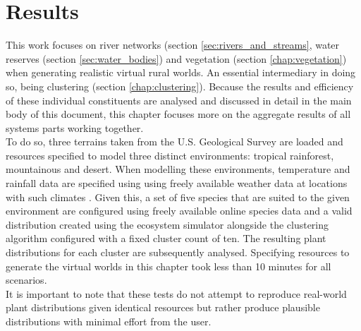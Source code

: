 \chapter{Results}

This work focuses on river networks (section \ref{sec:rivers_and_streams}, water reserves (section \ref{sec:water_bodies}) and vegetation (section \ref{chap:vegetation}) when generating realistic virtual rural worlds. An essential intermediary in doing so, being clustering (section \ref{chap:clustering}). Because the results and efficiency of these individual constituents are analysed and discussed in detail in the main body of this document, this chapter focuses more on the aggregate results of all systems parts working together. \\

To do so, three terrains taken from the U.S. Geological Survey \protect\footnotemark {} are loaded and resources specified to model three distinct environments: tropical rainforest, mountainous and desert. When modelling these environments, temperature and rainfall data are specified using using freely available weather data at locations with such climates \protect\footnotemark {}. Given this, a set of five species that are suited to the given environment are configured using freely available online species data  \protect\footnotemark {} and a valid distribution created using the ecosystem simulator alongside the clustering algorithm configured with a fixed cluster count of ten. The resulting plant distributions for each cluster are subsequently analysed. Specifying resources to generate the virtual worlds in this chapter took less than 10 minutes for all scenarios.\\

It is important to note that these tests do not attempt to reproduce real-world plant distributions given identical resources but rather produce plausible distributions with minimal effort from the user. \\
